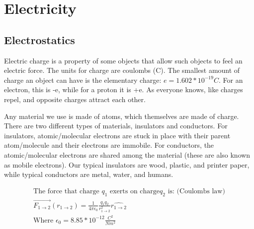 \section{Electricity}
  \subsection{Electrostatics}
  Electric charge is a property of some objects that allow such objects to feel an electric force. The units for charge are coulombs (C). The smallest amount of charge an object can have is the elementary charge: $e=1.602*10^{-19}C$. For an electron, this is -e, while for a proton it is +e. As everyone knows, like charges repel, and opposite charges attract each other.\par 
  Any material we use is made of atoms, which themselves are made of charge. There are two different types of materials, insulators and conductors. For insulators, atomic/molecular electrons are stuck in place with their parent atom/molecule and their electrons are immobile. For conductors, the atomic/molecular electrons are shared among the material (these are also known as mobile electrons). Our typical insulators are wood, plastic, and printer paper, while typical conductors are metal, water, and humans.\par
  \begin{align*}
    \text{The force that charge } q_1 \text{ exerts on charge} q_2 \text{ is: (Coulombs law)}\\
    \vec{F_{1\to2}}(r_{1\to2})=\frac{1}{4\pi \epsilon_0}\frac{q_1q_2}{r_{1\to2}^2}\hat{r_{1\to2}}\\
    \text{Where } \epsilon_0=8.85*10^{-12}\frac{C^2}{Nm^2}
  \end{align*}
